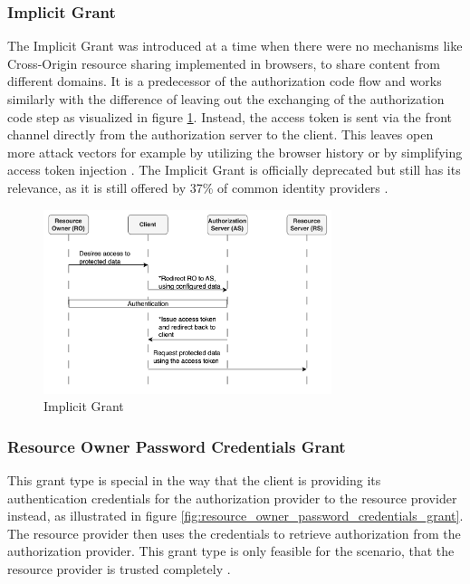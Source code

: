 \subsubsection{Implicit Grant}
The Implicit Grant was introduced at a time when there were no mechanisms like Cross-Origin resource sharing implemented in browsers, to share content from different domains. It is a predecessor of the authorization code flow and works similarly with the difference of leaving out the exchanging of the authorization code step as visualized in figure \ref{fig:implicit_grant}. Instead, the access token is sent via the front channel directly from the authorization server to the client. This leaves open more attack vectors for example by utilizing the browser history or by simplifying access token injection \cite{lodderstedt2020oauth}. The Implicit Grant is officially deprecated but still has its relevance, as it is still offered by 37\% of common identity providers \cite{philippaerts2022oauch}.

\begin{figure}[ht]
	\sffamily\footnotesize
	\includegraphics[width=0.75\textwidth]{pic/implicit_grant.png}
	\unitlength=0.75mm
	\linethickness{0.4pt}
	\caption{Implicit Grant}
	\label{fig:implicit_grant}
\end{figure}

\subsubsection{Resource Owner Password Credentials Grant}
This grant type is special in the way that the client is providing its authentication credentials for the authorization provider to the resource provider instead, as illustrated in figure \ref{fig:resource_owner_password_credentials_grant}. The resource provider then uses the credentials to retrieve authorization from the authorization provider. This grant type is only feasible for the scenario, that the resource provider is trusted completely \cite{hardt2012rfc}.

